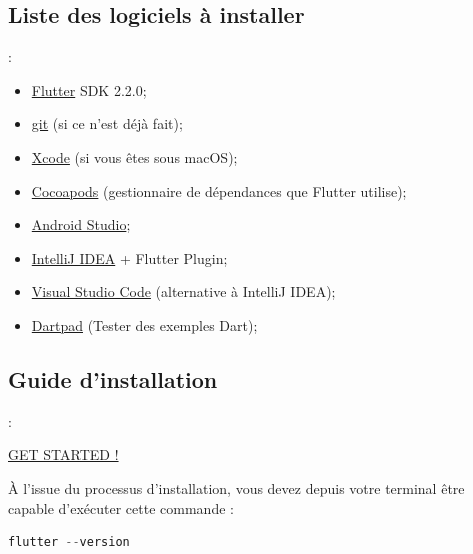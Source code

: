 \documentclass[10pt]{beamer}
\begin{document}
\subsection{Liste des logiciels à installer}
\begin{frame}[fragile,t]{\secname : \subsecname}
    \begin{itemize}
        \item \href{https://flutter.dev/docs/get-started/install}{Flutter} SDK 2.2.0;
        \item \href{https://git-scm.com/downloads}{git} (si ce n'est déjà fait);
        \item \href{https://itunes.apple.com/us/app/xcode/id497799835}{Xcode} (si vous êtes sous macOS);
        \item \href{https://guides.cocoapods.org/using/getting-started.html#installation}{Cocoapods} (gestionnaire de dépendances que Flutter utilise);
        \item \href{https://developer.android.com/studio/install}{Android Studio};
        \item \href{https://www.jetbrains.com/fr-fr/idea/download/#section=mac}{IntelliJ IDEA} + Flutter Plugin;
        \item \href{https://code.visualstudio.com/download}{Visual Studio Code} (alternative à IntelliJ IDEA);
        \item \href{https://plugins.jetbrains.com/plugin/16602-embedded-dartpad}{Dartpad} (Tester des exemples Dart);
    \end{itemize}
\end{frame}

\subsection{Guide d'installation}
\begin{frame}[fragile,t]{\secname : \subsecname}
    \begin{center}
        \href{https://flutter.dev/docs/get-started/install}{GET STARTED !}
    \end{center}
    À l'issue du processus d'installation, vous devez depuis votre terminal être capable d’exécuter cette commande :
    \begin{lstlisting}[caption={Connaître la version de flutter},language=C, label=getversion]
    flutter --version
    \end{lstlisting}


\end{frame}
\end{document}
